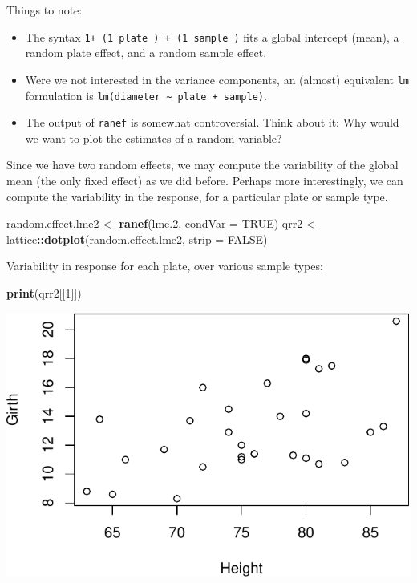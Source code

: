\documentclass[]{book}
\newenvironment{Shaded}{\begin{snugshade}}{\end{snugshade}}
\newcommand{\DataTypeTok}[1]{\textcolor[rgb]{0.13,0.29,0.53}{#1}}
\newcommand{\DecValTok}[1]{\textcolor[rgb]{0.00,0.00,0.81}{#1}}
\newcommand{\FloatTok}[1]{\textcolor[rgb]{0.00,0.00,0.81}{#1}}
\newcommand{\KeywordTok}[1]{\textcolor[rgb]{0.13,0.29,0.53}{\textbf{#1}}}
\newcommand{\NormalTok}[1]{#1}
\newcommand{\OperatorTok}[1]{\textcolor[rgb]{0.81,0.36,0.00}{\textbf{#1}}}
\newcommand{\OtherTok}[1]{\textcolor[rgb]{0.56,0.35,0.01}{#1}}
\newcommand{\StringTok}[1]{\textcolor[rgb]{0.31,0.60,0.02}{#1}}
\providecommand{\tightlist}{%
  \setlength{\itemsep}{0pt}\setlength{\parskip}{0pt}}
\theoremstyle{definition}
\theoremstyle{definition}
\theoremstyle{definition}
\theoremstyle{remark}
\begin{document}
Things to note:

\begin{itemize}
\tightlist
\item
  The syntax \texttt{1+\ (1\textbar{}\ plate\ )\ +\ (1\textbar{}\ sample\ )} fits a global intercept (mean), a random plate effect, and a random sample effect.
\item
  Were we not interested in the variance components, an (almost) equivalent \texttt{lm} formulation is \texttt{lm(diameter\ \textasciitilde{}\ plate\ +\ sample)}.
\item
  The output of \texttt{ranef} is somewhat controversial. Think about it: Why would we want to plot the estimates of a random variable?
\end{itemize}

Since we have two random effects, we may compute the variability of the global mean (the only fixed effect) as we did before.
Perhaps more interestingly, we can compute the variability in the response, for a particular plate or sample type.

\begin{Shaded}
\begin{Highlighting}[]
\NormalTok{random.effect.lme2 <-}\StringTok{ }\KeywordTok{ranef}\NormalTok{(lme}\FloatTok{.2}\NormalTok{, }\DataTypeTok{condVar =} \OtherTok{TRUE}\NormalTok{) }
\NormalTok{qrr2 <-}\StringTok{ }\NormalTok{lattice}\OperatorTok{::}\KeywordTok{dotplot}\NormalTok{(random.effect.lme2, }\DataTypeTok{strip =} \OtherTok{FALSE}\NormalTok{)}
\end{Highlighting}
\end{Shaded}

Variability in response for each plate, over various sample types:

\begin{Shaded}
\begin{Highlighting}[]
\KeywordTok{print}\NormalTok{(qrr2[[}\DecValTok{1}\NormalTok{]]) }
\end{Highlighting}
\end{Shaded}

\includegraphics[width=0.5\linewidth]{Rcourse_files/figure-latex/unnamed-chunk-206-1}
\end{document}
